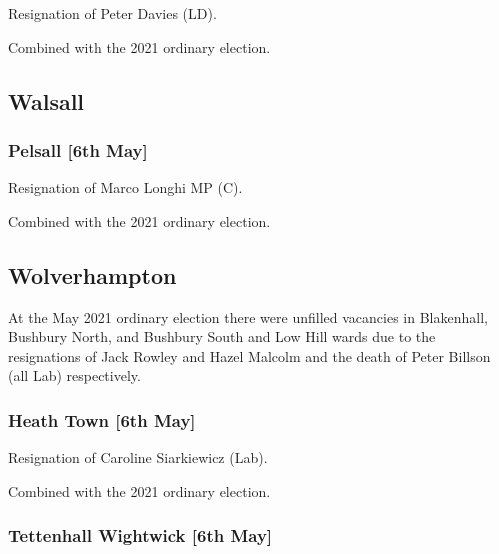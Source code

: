\documentclass[a4paper,openany]{book}
\begin{document}
\begin{resultsiii}
Resignation of Peter Davies (LD).

Combined with the 2021 ordinary election.

\subsection*{Walsall}

\subsubsection*{Pelsall \hspace*{\fill}\nolinebreak[1]%
	\enspace\hspace*{\fill}
	[6th May]}


Resignation of Marco Longhi MP (C).

Combined with the 2021 ordinary election.

\subsection*{Wolverhampton}

At the May 2021 ordinary election there were unfilled vacancies in Blakenhall, Bushbury North, and Bushbury South and Low Hill wards due to the resignations of Jack Rowley and Hazel Malcolm and the death of Peter Billson (all Lab) respectively.

\subsubsection*{Heath Town \hspace*{\fill}\nolinebreak[1]%
	\enspace\hspace*{\fill}
	[6th May]}


Resignation of Caroline Siarkiewicz (Lab).

Combined with the 2021 ordinary election.

\subsubsection*{Tettenhall Wightwick \hspace*{\fill}\nolinebreak[1]%
	\enspace\hspace*{\fill}
	[6th May]}


\end{resultsiii}
\end{document}
